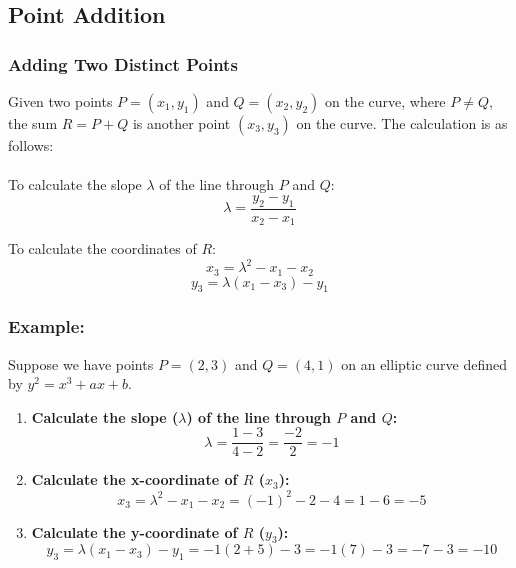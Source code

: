 \documentclass[11pt, letterpaper]{article}
\begin{document}
\subsection{Point Addition}

\subsubsection{Adding Two Distinct Points}
Given two points \(P = (x_1, y_1)\) and \(Q = (x_2, y_2)\) on the curve, where \(P \neq Q\), the sum \(R = P + Q\) is another point \((x_3, y_3)\) on the curve. The calculation is as follows:\\ \\

To calculate the slope \(\lambda\) of the line through \(P\) and \(Q\):
\begin{equation}
\lambda = \frac{y_2 - y_1}{x_2 - x_1}
\end{equation}

To calculate the coordinates of \(R\):
\begin{equation}
x_3 = \lambda^2 - x_1 - x_2
\end{equation}
\begin{equation}
y_3 = \lambda (x_1 - x_3) - y_1
\end{equation}


\subsubsection*{Example:}

Suppose we have points \(P = (2, 3)\) and \(Q = (4, 1)\) on an elliptic curve defined by \(y^2 = x^3 + ax + b\).

\begin{enumerate}
\item \textbf{Calculate the slope (\(\lambda\)) of the line through \(P\) and \(Q\):}
\begin{equation}
\lambda = \frac{1 - 3}{4 - 2} = \frac{-2}{2} = -1
\end{equation}

\item \textbf{Calculate the x-coordinate of \(R\) (\(x_3\)):}
\begin{equation}
x_3 = \lambda^2 - x_1 - x_2 = (-1)^2 - 2 - 4 = 1 - 6 = -5
\end{equation}

\item \textbf{Calculate the y-coordinate of \(R\) (\(y_3\)):}
\begin{equation}
y_3 = \lambda (x_1 - x_3) - y_1 = -1 (2 + 5) - 3 = -1 (7) - 3 = -7 - 3 = -10
\end{equation}
\end{enumerate}
\end{document}
